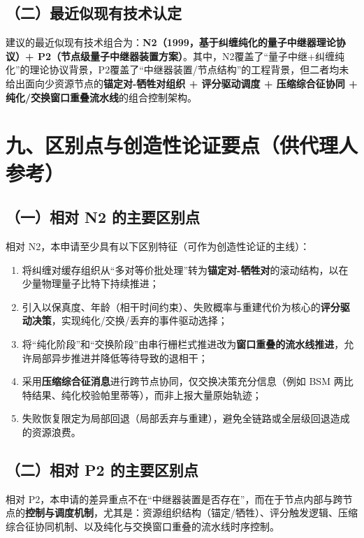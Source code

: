 \documentclass[12pt,a4paper]{article}
\begin{document}
\subsection*{（二）最近似现有技术认定}

建议的最近似现有技术组合为：\textbf{N2（1999，基于纠缠纯化的量子中继器理论协议）+ P2（节点级量子中继器装置方案）}。其中，N2覆盖了“量子中继+纠缠纯化”的理论协议背景，P2覆盖了“中继器装置/节点结构”的工程背景，但二者均未给出面向少资源节点的\textbf{锚定对-牺牲对组织 + 评分驱动调度 + 压缩综合征协同 + 纯化/交换窗口重叠流水线}的组合控制架构。

\section*{九、区别点与创造性论证要点（供代理人参考）}

\subsection*{（一）相对 N2 的主要区别点}

相对 N2，本申请至少具有以下区别特征（可作为创造性论证的主线）：
\begin{enumerate}[label=(\arabic*)]
    \item 将纠缠对缓存组织从“多对等价批处理”转为\textbf{锚定对-牺牲对}的滚动结构，以在少量物理量子比特下持续推进；
    \item 引入以保真度、年龄（相干时间约束）、失败概率与重建代价为核心的\textbf{评分驱动决策}，实现纯化/交换/丢弃的事件驱动选择；
    \item 将“纯化阶段”和“交换阶段”由串行栅栏式推进改为\textbf{窗口重叠的流水线推进}，允许局部异步推进并降低等待导致的退相干；
    \item 采用\textbf{压缩综合征消息}进行跨节点协同，仅交换决策充分信息（例如 BSM 两比特结果、纯化校验帕里蒂等），而非上报大量原始轨迹；
    \item 失败恢复限定为局部回退（局部丢弃与重建），避免全链路或全层级回退造成的资源浪费。
\end{enumerate}

\subsection*{（二）相对 P2 的主要区别点}

相对 P2，本申请的差异重点不在“中继器装置是否存在”，而在于节点内部与跨节点的\textbf{控制与调度机制}，尤其是：资源组织结构（锚定/牺牲）、评分触发逻辑、压缩综合征协同机制、以及纯化与交换窗口重叠的流水线时序控制。
\end{document}
